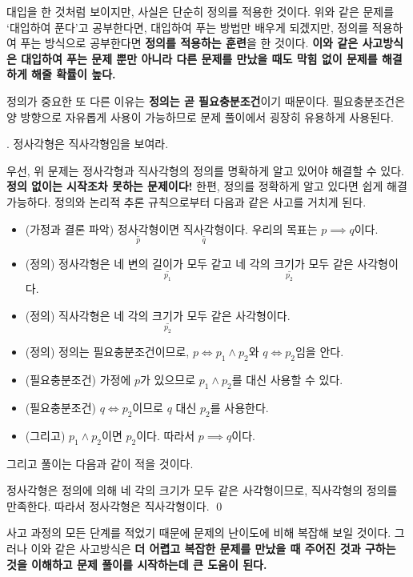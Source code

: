 대입을 한 것처럼 보이지만, 사실은 단순히 정의를 적용한 것이다. 위와 같은 문제를 `대입하여 푼다'고 공부한다면, 대입하여 푸는 방법만 배우게 되겠지만, 정의를 적용하여 푸는 방식으로 공부한다면 \textbf{정의를 적용하는 훈련}을 한 것이다. \textbf{이와 같은 사고방식은 대입하여 푸는 문제 뿐만 아니라 다른 문제를 만났을 때도 막힘 없이 문제를 해결하게 해줄 확률이 높다.}

정의가 중요한 또 다른 이유는 \textbf{정의는 곧 필요충분조건}이기 때문이다. 필요충분조건은 양 방향으로 자유롭게 사용이 가능하므로 문제 풀이에서 굉장히 유용하게 사용된다.

\bigskip

\ex. 정사각형은 직사각형임을 보여라.

\pagebreak

우선, 위 문제는 정사각형과 직사각형의 정의를 명확하게 알고 있어야 해결할 수 있다. \textbf{정의 없이는 시작조차 못하는 문제이다!} 한편, 정의를 정확하게 알고 있다면 쉽게 해결 가능하다. 정의와 논리적 추론 규칙으로부터 다음과 같은 사고를 거치게 된다.

\begin{itemize}
    \item (가정과 결론 파악) \(\underset{p}{\underline{\text{정사각형}}}\)이면 \(\underset{q}{\underline{\text{직사각형}}}\)이다. 우리의 목표는 \(p \implies q\)이다.
    \item (정의) 정사각형은 \(\underset{p_1}{\underline{\text{네 변의 길이가 모두 같}}}\)고 \(\underset{p_2}{\underline{\text{네 각의 크기가 모두 같}}}\)은 사각형이다.
    \item (정의) 직사각형은 \(\underset{p_2}{\underline{\text{네 각의 크기가 모두 같}}}\)은 사각형이다.
    \item (정의) 정의는 필요충분조건이므로, \(p \iff p_1 \wedge p_2\)와 \(q \iff p_2\)임을 안다.
    \item (필요충분조건) 가정에 \(p\)가 있으므로 \(p_1 \wedge p_2\)를 대신 사용할 수 있다.
    \item (필요충분조건) \(q \iff p_2\)이므로 \(q\) 대신 \(p_2\)를 사용한다.
    \item (그리고) \(p_1 \wedge p_2\)이면 \(p_2\)이다. 따라서 \(p \implies q\)이다.
\end{itemize}

그리고 풀이는 다음과 같이 적을 것이다.

\pf 정사각형은 정의에 의해 네 각의 크기가 모두 같은 사각형이므로, 직사각형의 정의를 만족한다. 따라서 정사각형은 직사각형이다. \qed

사고 과정의 모든 단계를 적었기 때문에 문제의 난이도에 비해 복잡해 보일 것이다. 그러나 이와 같은 사고방식은 \textbf{더 어렵고 복잡한 문제를 만났을 때 주어진 것과 구하는 것을 이해하고 문제 풀이를 시작하는데 큰 도움이 된다.}

